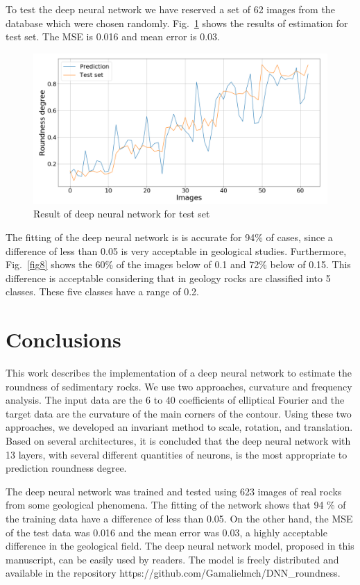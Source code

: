 \documentclass[conference]{IEEEtran}
\begin{document}
To test the deep neural network we have reserved a set of 62 images from the database which were chosen randomly. Fig.~\ref{fig9} shows the results of estimation for test set. The MSE is 0.016 and mean error is 0.03.

\begin{figure}[htbp]
	\centerline{\includegraphics[scale=0.3]{fig9.png}}
	\caption{Result of deep neural network for test set}
	\label{fig9}
\end{figure}

The fitting of the deep neural network is  is accurate for 94\% of cases, since a difference of less than 0.05 is very acceptable in geological studies. Furthermore, Fig.~\ref{fig8} shows the 60\% of the images below of 0.1 and 72\% below of 0.15. This difference is acceptable considering that in geology rocks are classified into 5 classes. These five classes have a range of 0.2.

\section{Conclusions}
This work describes the implementation of a deep neural network to estimate the roundness of sedimentary rocks. We use two approaches, curvature and frequency analysis. The input data are the 6 to 40 coefficients of elliptical Fourier and the target data are the curvature of the main corners of the contour. Using these two approaches, we developed an invariant method to scale, rotation, and translation. Based on several architectures, it is concluded that the deep neural network with 13 layers, with several different quantities of neurons, is the most appropriate to prediction roundness degree. 

The deep neural network was trained and tested using 623 images of real rocks from some geological phenomena. The fitting of the network shows that 94 \% of the training data have a difference of less than 0.05. On the other hand, the MSE of the test data was 0.016 and the mean error was 0.03, a highly acceptable difference in the geological field. The deep neural network model, proposed in this manuscript, can be easily used by readers. The model is freely distributed and available in the repository https://github.com/Gamalielmch/DNN\_roundness.
\end{document}
